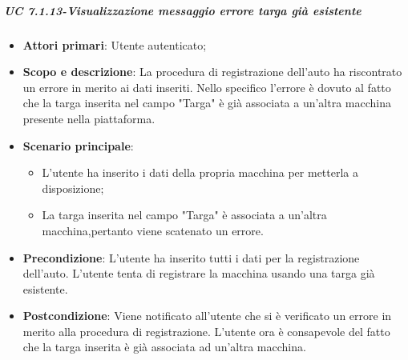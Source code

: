                  \subparagraph{UC 7.1.13-Visualizzazione messaggio errore targa già esistente}
    \begin{itemize}
                \item \textbf{Attori primari}: Utente autenticato;
               
                 \item \textbf{Scopo e descrizione}: La procedura di registrazione dell'auto ha riscontrato un errore in merito ai dati inseriti. Nello specifico l'errore è dovuto al fatto che la targa inserita nel campo "Targa" è già associata a un'altra macchina presente nella piattaforma.
                 \item \textbf{Scenario principale}:
                 \begin{itemize}
                     \item L'utente ha inserito i dati della propria macchina per metterla a disposizione;
                     \item La targa inserita nel campo "Targa" è associata a un'altra macchina,pertanto viene scatenato un errore.
                 \end{itemize}
                 \item \textbf{Precondizione}: L'utente ha inserito tutti i dati per la registrazione dell'auto. L'utente tenta di registrare la macchina usando una targa già esistente.
                 \item \textbf{Postcondizione}: Viene notificato all'utente che si è verificato un errore in merito alla procedura di registrazione. L’utente ora è consapevole del fatto che la targa inserita è già associata ad un'altra macchina.
                 \end{itemize}
                 
